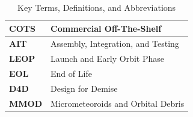 \begin{table}[H]
{\begin{tabularx}{\textwidth}{|>{\raggedright\arraybackslash}p{3.2cm}|>{\raggedright\arraybackslash}X|}
    \textbf{COTS}                     & Commercial Off-The-Shelf                          \\ \hline
    \textbf{AIT}                      & Assembly, Integration, and Testing                \\ \hline
    \textbf{LEOP}                     & Launch and Early Orbit Phase                      \\ \hline
    \textbf{EOL}                      & End of Life                                       \\ \hline
    \textbf{D4D}                      & Design for Demise                                 \\ \hline
    \textbf{MMOD}                     & Micrometeoroids and Orbital Debris                \\ \hline
\end{tabularx}}
\caption{Key Terms, Definitions, and Abbreviations}
\end{table}

